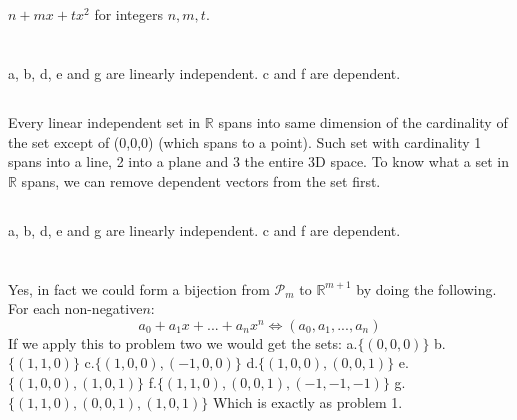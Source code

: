 \documentclass{article}
\begin{document}
\subsection{}
$n + mx + tx^2$ for integers $n, m, t$.

\section{}
\subsection{}
a, b, d, e and g are linearly independent. c and f are dependent.
\subsection{}
Every linear independent set in $\mathbb{R}$ spans into same dimension of the cardinality of the set except of {(0,0,0)} (which spans to a point). Such set with cardinality 1 spans into a line, 2 into a plane and 3 the entire 3D space. To know what a set in $\mathbb{R}$ spans, we can remove dependent vectors from the set first.
\subsection{}
a, b, d, e and g are linearly independent. c and f are dependent.

\section{}
Yes, in fact we could form a bijection from $\mathcal{P}_m$ to $\mathbb{R}^{m+1}$ by doing the following. For each non-negative$n$:
$$a_0 + a_1 x + ... + a_n x^n \Longleftrightarrow (a_0, a_1, ... , a_n)$$\newline
If we apply this to problem two we would get the sets:\newline
a.$\{(0,0,0)\}$\newline
b.$\{(1,1,0)\}$\newline
c.$\{(1,0,0),(−1,0,0)\}$\newline
d.$\{(1,0,0),(0,0,1)\}$\newline
e.$\{(1,0,0),(1,0,1)\}$\newline
f.$\{(1,1,0),(0,0,1),(−1,−1,−1)\}$\newline
g.$\{(1,1,0),(0,0,1),(1,0,1)\}$\newline
Which is exactly as problem 1.
\end{document}
